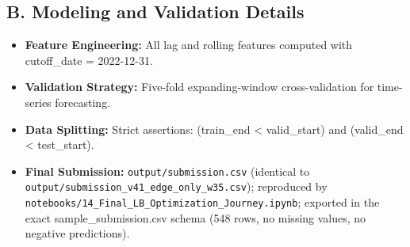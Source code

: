 \documentclass[10pt]{article}
\begin{document}
\subsection*{B. Modeling and Validation Details}
\begin{itemize}
    \item \textbf{Feature Engineering:} All lag and rolling features computed with cutoff\_date = 2022-12-31.
    \item \textbf{Validation Strategy:} Five-fold expanding-window cross-validation for time-series forecasting.
    \item \textbf{Data Splitting:} Strict assertions: (train\_end < valid\_start) and (valid\_end < test\_start).
    \item \textbf{Final Submission:} \texttt{output/submission.csv} (identical to \texttt{output/submission\_v41\_edge\_only\_w35.csv}); reproduced by \texttt{notebooks/14\_Final\_LB\_Optimization\_Journey.ipynb}; exported in the exact sample\_submission.csv schema (548 rows, no missing values, no negative predictions).
\end{itemize}
\end{document}

